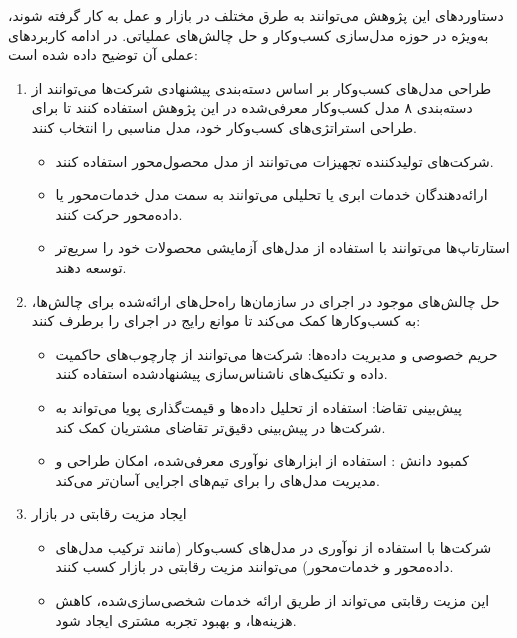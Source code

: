\documentclass[10pt, twocolumn]{article}
\begin{document}
دستاوردهای این پژوهش می‌توانند به طرق مختلف در بازار و عمل به کار گرفته شوند، به‌ویژه در حوزه مدل‌سازی کسب‌وکار  و حل چالش‌های عملیاتی. در ادامه کاربردهای عملی آن توضیح داده شده است:  
\begin{enumerate}
\item 
طراحی مدل‌های کسب‌وکار  بر اساس دسته‌بندی پیشنهادی  
   شرکت‌ها می‌توانند از دسته‌بندی ۸ مدل کسب‌وکار معرفی‌شده در این پژوهش استفاده کنند تا برای طراحی استراتژی‌های کسب‌وکار  خود، مدل مناسبی را انتخاب کنند.  

\begin{itemize}
\item 
شرکت‌های تولیدکننده تجهیزات  می‌توانند از مدل محصول‌محور استفاده کنند.  
\item ارائه‌دهندگان خدمات ابری یا تحلیلی می‌توانند به سمت مدل خدمات‌محور یا داده‌محور حرکت کنند.  
\item استارتاپ‌ها می‌توانند با استفاده از مدل‌های آزمایشی  محصولات خود را سریع‌تر توسعه دهند.  
\end{itemize}

\item 
حل چالش‌های موجود در اجرای  در سازمان‌ها  
   راه‌حل‌های ارائه‌شده برای چالش‌ها، به کسب‌وکارها کمک می‌کند تا موانع رایج در اجرای  را برطرف کنند:  
\begin{itemize}
\item حریم خصوصی و مدیریت داده‌ها: شرکت‌ها می‌توانند از چارچوب‌های حاکمیت داده و تکنیک‌های ناشناس‌سازی پیشنهادشده استفاده کنند.  
\item پیش‌بینی تقاضا: استفاده از تحلیل داده‌ها و قیمت‌گذاری پویا می‌تواند به شرکت‌ها در پیش‌بینی دقیق‌تر تقاضای مشتریان کمک کند.  
\item کمبود دانش : استفاده از ابزارهای نوآوری معرفی‌شده، امکان طراحی و مدیریت مدل‌های  را برای تیم‌های اجرایی آسان‌تر می‌کند.  
\end{itemize}
\item 
ایجاد مزیت رقابتی در بازار  
\begin{itemize} 
\item شرکت‌ها با استفاده از نوآوری در مدل‌های کسب‌وکار (مانند ترکیب مدل‌های داده‌محور و خدمات‌محور) می‌توانند مزیت رقابتی در بازار  کسب کنند.  
\item این مزیت رقابتی می‌تواند از طریق ارائه خدمات شخصی‌سازی‌شده، کاهش هزینه‌ها، و بهبود تجربه مشتری ایجاد شود.  
\end{itemize}


\end{enumerate}
\end{document}
